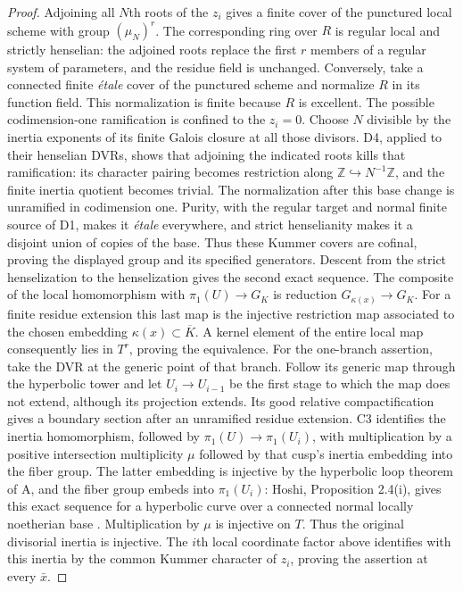 \begin{proof}
Adjoining all $N$th roots of the $z_i$ gives a finite cover of the punctured local scheme with group $(\mu_N)^r$. The corresponding ring over $R$ is regular local and strictly henselian: the adjoined roots replace the first $r$ members of a regular system of parameters, and the residue field is unchanged. Conversely, take a connected finite \emph{\'etale} cover of the punctured scheme and normalize $R$ in its function field. This normalization is finite because $R$ is excellent. The possible codimension-one ramification is confined to the $z_i=0$. Choose $N$ divisible by the inertia exponents of its finite Galois closure at all those divisors. D4, applied to their henselian DVRs, shows that adjoining the indicated roots kills that ramification: its character pairing becomes restriction along $\mathbb Z\hookrightarrow N^{-1}\mathbb Z$, and the finite inertia quotient becomes trivial. The normalization after this base change is unramified in codimension one. Purity, with the regular target and normal finite source of D1, makes it \emph{\'etale} everywhere, and strict henselianity makes it a disjoint union of copies of the base. Thus these Kummer covers are cofinal, proving the displayed group and its specified generators. Descent from the strict henselization to the henselization gives the second exact sequence.
The composite of the local homomorphism with $\pi_1(U)\to G_K$ is reduction $G_{\kappa(x)}\to G_K$. For a finite residue extension this last map is the injective restriction map associated to the chosen embedding $\kappa(x)\subset\overline K$. A kernel element of the entire local map consequently lies in $T^r$, proving the equivalence.
For the one-branch assertion, take the DVR at the generic point of that branch. Follow its generic map through the hyperbolic tower and let $U_i\to U_{i-1}$ be the first stage to which the map does not extend, although its projection extends. Its good relative compactification gives a boundary section after an unramified residue extension. C3 identifies the inertia homomorphism, followed by $\pi_1(U)\to\pi_1(U_i)$, with multiplication by a positive intersection multiplicity $\mu$ followed by that cusp's inertia embedding into the fiber group. The latter embedding is injective by the hyperbolic loop theorem of A, and the fiber group embeds into $\pi_1(U_i)$: Hoshi, Proposition 2.4(i), gives this exact sequence for a hyperbolic curve over a connected normal locally noetherian base \cite{DE_Hoshi}. Multiplication by $\mu$ is injective on $T$. Thus the original divisorial inertia is injective. The $i$th local coordinate factor above identifies with this inertia by the common Kummer character of $z_i$, proving the assertion at every $\bar x$.

\end{proof}
